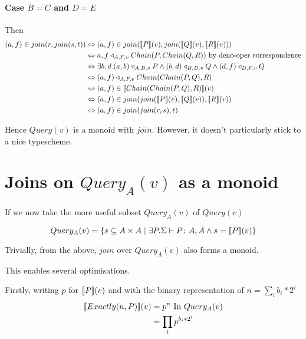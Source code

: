\documentclass[12pt,a4paper,twoside,openright]{report}
\newcommand{\db}[1]{{\bf [\![}#1{\bf ]\!]}}
\newcommand{\deno}[1]{\db{#1}(v)}
\newcommand{\setComp}[2]{\left\lbrace #1 \mid #2 \right\rbrace}
\newcommand{\typeRule}[2]{\Sigma\vdash #1 \colon #2}
\newcommand{\denoRule}[2]{#1 \in \deno{#2}}
\newcommand{\opRule}[3]{#1 \triangleleft_{#2, v} #3}
\newcommand{\query}[0]{Query(v)}
\newcommand{\queryT}[1]{Query_{#1}(v)}
\begin{document}
{{\paragraph{Case $B = C$ and $D = E$}
Then
\begin{equation}\label{Well typed}
\begin{split}
(a, f) \in join(r, join(s, t)) & \Leftrightarrow (a, f) \in join(\deno{P}, join(\deno{Q},\deno{R}))\\
							  & \Leftrightarrow \opRule{a,f}{A, F}{Chain(P, Chain(Q, R))} \mbox{ by deno-oper correspondence}\\
							& \Leftrightarrow \exists b, d. \opRule{(a, b)}{A, B}{P} \wedge \opRule{(b,d)}{B,D}{Q} \wedge \opRule{(d,f)}{D,F}{Q}\\
							& \Leftrightarrow \opRule{(a, f)}{A, F}{Chain(Chain(P, Q), R)}\\
							& \Leftrightarrow \denoRule{(a, f)}{Chain(Chain(P, Q), R)}\\
							& \Leftrightarrow (a, f) \in join(join(\deno{P}, \deno{Q}), \deno{R})\\
							& \Leftrightarrow (a, f) \in join(join(r, s), t)\\							
\end{split}
\end{equation}

Hence $\query$ is a monoid with $join$. However, it doesn't particularly stick to a nice typescheme.
	
\section{Joins on $\queryT{A}$ as a monoid}
If we now take the more useful subset $\queryT{A}$ of $\query$

\begin{equation}
\queryT{A} = \setComp{s \subseteq A \times A}{\exists P. \typeRule{P}{A, A} \wedge s = \deno{P}}
\end{equation}

Trivially, from the above, $join$ over $\queryT{A}$ also forms a monoid.

This enables several optimisations.

Firstly, writing $p$ for $\deno{P}$ and with the binary representation of $n = \sum_i{b_i * 2^{i}}$
\begin{equation}\label{ExactlyReordering}
\begin{split}
\deno{Exactly(n, P)} & = p^{n} \mbox{ In $\queryT{A}$}\\
					& = \prod_i {p^{b_i * 2^i} }
\end{split}
\end{equation}

}}
\end{document}
